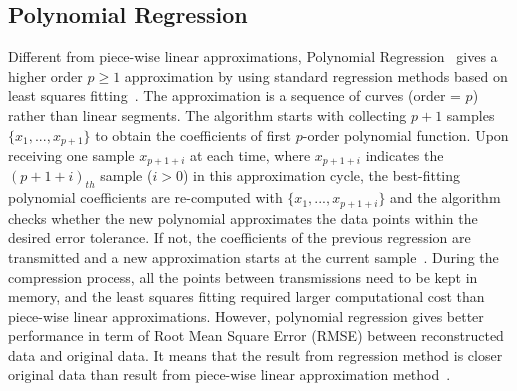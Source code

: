 \subsection{Polynomial Regression}
\label{sec:polynomial}
Different from piece-wise linear approximations, Polynomial
Regression~\cite{zordan2014performance} gives a higher order $p \geqslant1$
approximation by using standard regression methods based on least squares
fitting~\cite{phillips2003interpolation}. The approximation is a sequence of
curves (order = $p$) rather than linear segments. The algorithm starts with
collecting $p+1$ samples $\{x_1, ..., x_{p+1} \}$ to obtain the coefficients of
first $p$-order polynomial function. Upon receiving one sample $x_{p+1+i}$ at
each time, where $x_{p+1+i}$ indicates the $(p+1+i)_{th}$ sample ($i>0$) in this
approximation cycle, the best-fitting polynomial coefficients are re-computed
with $\{ x_1, ..., x_{p+1+i}\}$ and the algorithm checks whether the new
polynomial approximates the data points within the desired error tolerance. If
not, the coefficients of the previous regression are transmitted and a new
approximation starts at the current sample~\cite{zordan2014performance}. During
the compression process, all the points between transmissions need to be kept in
memory, and the least squares fitting required larger computational cost than
piece-wise linear approximations. However, polynomial regression gives better
performance in term of Root Mean Square Error (RMSE) between reconstructed data
and original data. It means that the result from regression method is closer
original data than result from piece-wise linear approximation
method~\cite{zordan2014performance}.




